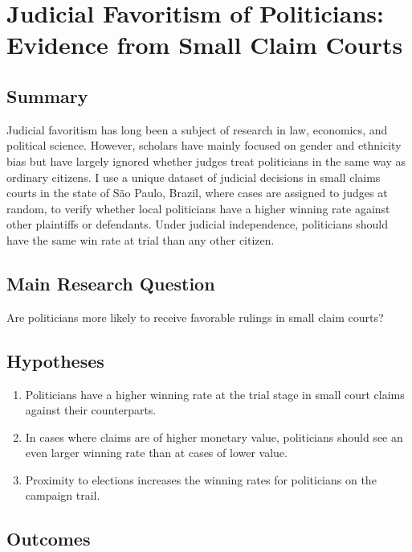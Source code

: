 \documentclass[]{article}
\title{}
\author{}
\date{}
\begin{document}
\hypertarget{title2}{%
\section{Judicial Favoritism of Politicians: Evidence from Small Claim
Courts}\label{title2}}

\hypertarget{summary}{%
\subsection{Summary}\label{summary}}

Judicial favoritism has long been a subject of research in law,
economics, and political science. However, scholars have mainly focused
on gender and ethnicity bias but have largely ignored whether judges
treat politicians in the same way as ordinary citizens. I use a unique
dataset of judicial decisions in small claims courts in the state of São
Paulo, Brazil, where cases are assigned to judges at random, to verify
whether local politicians have a higher winning rate against other
plaintiffs or defendants. Under judicial independence, politicians
should have the same win rate at trial than any other citizen.

\hypertarget{main-research-question}{%
\subsection{Main Research Question}\label{main-research-question}}

Are politicians more likely to receive favorable rulings in small claim
courts?

\hypertarget{hypotheses}{%
\subsection{Hypotheses}\label{hypotheses}}

\begin{enumerate}
\item
  Politicians have a higher winning rate at the trial stage in small
  court claims against their counterparts.
\item
  In cases where claims are of higher monetary value, politicians should
  see an even larger winning rate than at cases of lower value.
\item
  Proximity to elections increases the winning rates for politicians on
  the campaign trail.
\end{enumerate}

\hypertarget{outcomes}{%
\subsection{Outcomes}\label{outcomes}}
\end{document}
